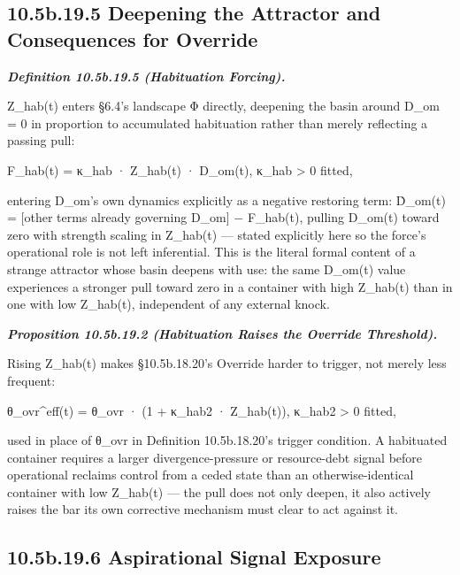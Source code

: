 \documentclass[
]{article}
\begin{document}
\hypertarget{b.19.5-deepening-the-attractor-and-consequences-for-override}{%
\subsection{10.5b.19.5 Deepening the Attractor and Consequences for
Override}\label{b.19.5-deepening-the-attractor-and-consequences-for-override}}

\emph{\textbf{Definition 10.5b.19.5 (Habituation Forcing).}}

Z\_hab(t) enters §6.4's landscape Φ directly, deepening the basin around
D\_om = 0 in proportion to accumulated habituation rather than merely
reflecting a passing pull:

F\_hab(t) = κ\_hab · Z\_hab(t) · D\_om(t), κ\_hab \textgreater{} 0
fitted,

entering D\_om's own dynamics explicitly as a negative restoring term:
Ḋ\_om(t) = {[}other terms already governing D\_om{]} − F\_hab(t),
pulling D\_om(t) toward zero with strength scaling in Z\_hab(t) ---
stated explicitly here so the force's operational role is not left
inferential. This is the literal formal content of a strange attractor
whose basin deepens with use: the same D\_om(t) value experiences a
stronger pull toward zero in a container with high Z\_hab(t) than in one
with low Z\_hab(t), independent of any external knock.

\emph{\textbf{Proposition 10.5b.19.2 (Habituation Raises the Override
Threshold).}}

Rising Z\_hab(t) makes §10.5b.18.20's Override harder to trigger, not
merely less frequent:

θ\_ovr\^{}eff(t) = θ\_ovr · (1 + κ\_hab2 · Z\_hab(t)), κ\_hab2
\textgreater{} 0 fitted,

used in place of θ\_ovr in Definition 10.5b.18.20's trigger condition. A
habituated container requires a larger divergence-pressure or
resource-debt signal before operational reclaims control from a ceded
state than an otherwise-identical container with low Z\_hab(t) --- the
pull does not only deepen, it also actively raises the bar its own
corrective mechanism must clear to act against it.

\hypertarget{b.19.6-aspirational-signal-exposure}{%
\subsection{10.5b.19.6 Aspirational Signal
Exposure}\label{b.19.6-aspirational-signal-exposure}}
\end{document}
